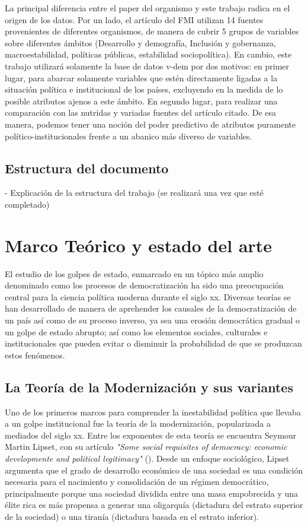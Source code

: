 \documentclass{article}
\begin{document}
La principal diferencia entre el paper del organismo y este trabajo radica en el origen
de los datos. Por un lado, el artículo del FMI utilizan 14 fuentes provenientes de 
diferentes organismos, de manera de cubrir 5 grupos de variables sobre diferentes ámbitos 
(Desarrollo y demografía, Inclusión y gobernanza, macroestabilidad, políticas públicas, 
estabilidad sociopolítica). En cambio, este trabajo utilizará solamente la base de datos 
v-dem por dos motivos: en primer lugar, para abarcar solamente variables que estén 
directamente ligadas a la situación política e institucional de los países, excluyendo en 
la medida de lo posible atributos ajenos a este ámbito. En segundo lugar, para realizar 
una comparación con las nutridas y variadas fuentes del artículo citado. De esa manera, 
podemos tener una noción del poder predictivo de atributos puramente 
político-institucionales frente a un abanico más diverso de variables.

\subsection{Estructura del documento}
- Explicación de la estructura del trabajo (se realizará una vez que esté completado)


\section{Marco Teórico y estado del arte}

El estudio de los golpes de estado, enmarcado en un tópico más amplio denominado
como los procesos de democratización ha sido una 
preocupación central para la ciencia política moderna durante el siglo xx. Diversas teorías
se han desarrollado de manera de aprehender los causales de la democratización
de un país así como de su proceso inverso, ya sea una erosión democrática gradual o un
golpe de estado abrupto; así como los elementos sociales, culturales e institucionales 
que pueden evitar o disminuir la probabilidad de que se produzcan estos fenómenos.

\subsection{La Teoría de la Modernización y sus variantes}

Uno de los primeros marcos para comprender la inestabilidad política que llevaba a un golpe
institucional fue la teoría de la modernización, popularizada a mediados del siglo xx. 
Entre los exponentes de esta teoría se
encuentra Seymour Martin Lipset, con su artículo \textit{"Some social requisites 
of democracy: economic developmente and political legitimacy"} (\citeyear{lipset1959some}). 
Desde un enfoque sociológico, Lipset
argumenta que el grado de desarrollo económico de una sociedad es una condición 
necesaria para el nacimiento y consolidación de un régimen democrático, principalmente
porque una sociedad dividida entre una masa empobrecida y una élite rica es más
propensa a generar una oligarquía (dictadura del estrato superior de la sociedad) o una
tiranía (dictadura basada en el estrato inferior).
\end{document}
